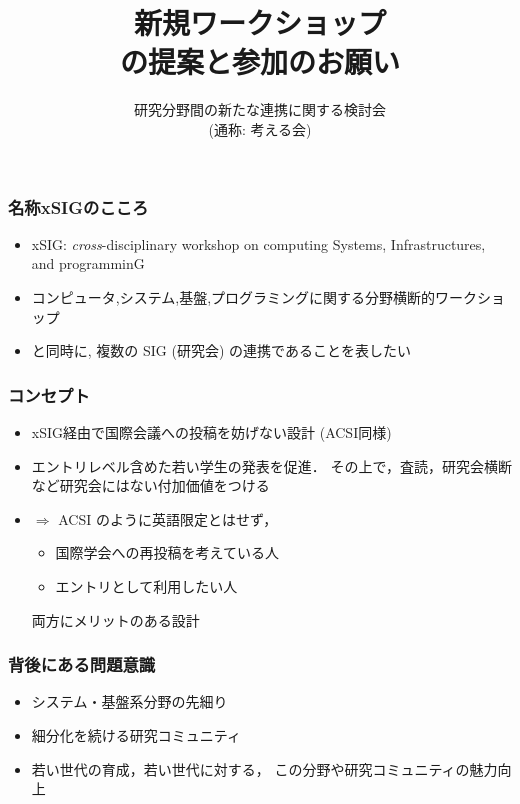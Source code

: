 \documentclass[12pt,dvipdfmx]{beamer}
\title{新規ワークショップ \\
\confname の提案と参加のお願い}
\institute{}
\author{研究分野間の新たな連携に関する検討会 \\
(通称: 考える会)}
\date{}
\newcommand{\confname}{{xSIG}}
\newcommand{\ao}[1]{{\color{blue}#1}}
\begin{document}
\maketitle

\begin{frame}
\frametitle{名称\confname のこころ}
\begin{itemize}
\item xSIG: \emph{\ao{cross}}-disciplinary workshop on computing \ao{S}ystems, \ao{I}nfrastructures, and programmin\ao{G} 
\item コンピュータ,システム,基盤,プログラミングに関する分野横断的ワークショップ
\item と同時に, 複数の SIG (研究会) の連携であることを表したい
\end{itemize}
\end{frame}

\begin{frame}
\frametitle{コンセプト}
\begin{itemize}
\item \confname 経由で\ao{国際会議への投稿を妨げない}設計 (ACSI同様)
\item \ao{エントリレベル}含めた若い学生の発表を促進．
その上で，査読，研究会横断など研究会にはない付加価値をつける
\item $\Rightarrow$ ACSI のように英語限定とはせず，
  \begin{itemize}
  \item 国際学会への再投稿を考えている人
  \item エントリとして利用したい人
  \end{itemize}
\ao{両方にメリット}のある設計
\end{itemize}

\end{frame}


\begin{frame}
\frametitle{背後にある問題意識}
\begin{itemize}
\item システム・基盤系分野の先細り
\item 細分化を続ける研究コミュニティ
\item 若い世代の育成，若い世代に対する，
この分野や研究コミュニティの魅力向上
\end{itemize}
\end{frame}
\end{document}
